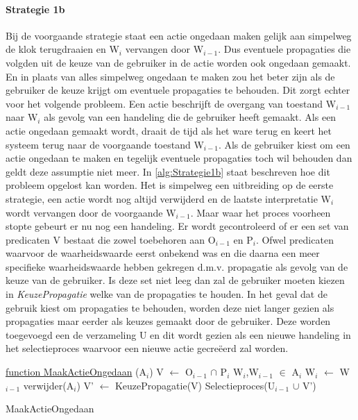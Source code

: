 \paragraph{Strategie 1b}
Bij de voorgaande strategie staat een actie ongedaan maken gelijk aan simpelweg de klok terugdraaien en W$_{i}$ vervangen door W$_{i-1}$. Dus eventuele propagaties die volgden uit de keuze van de gebruiker in de actie worden ook ongedaan gemaakt. En in plaats van alles simpelweg ongedaan te maken zou het beter zijn als de gebruiker de keuze krijgt om eventuele propagaties te behouden. Dit zorgt echter voor het volgende probleem. Een actie beschrijft de overgang van toestand W$_{i-1}$ naar W$_{i}$ als gevolg van een handeling die de gebruiker heeft gemaakt. Als een actie ongedaan gemaakt wordt, draait de tijd als het ware terug en keert het systeem terug naar de voorgaande toestand W$_{i-1}$. Als de gebruiker kiest om een actie ongedaan te maken en tegelijk eventuele propagaties toch wil behouden dan geldt deze assumptie niet meer. In \ref{alg:Strategie1b} staat beschreven hoe dit probleem opgelost kan worden. Het is simpelweg een uitbreiding op de eerste strategie, een actie wordt nog altijd verwijderd en de laatste interpretatie W$_{i}$ wordt vervangen door de voorgaande W$_{i-1}$. Maar waar het proces voorheen stopte gebeurt er nu nog een handeling. Er wordt gecontroleerd of er een set van predicaten V bestaat die zowel toebehoren aan O$_{i-1}$ en P$_{i}$. Ofwel predicaten waarvoor de waarheidswaarde eerst onbekend was en die daarna een meer specifieke waarheidswaarde hebben gekregen d.m.v. propagatie als gevolg van de keuze van de gebruiker. Is deze set niet leeg dan zal de gebruiker moeten kiezen in \textit{KeuzePropagatie} welke van de propagaties te houden. In het geval dat de gebruik kiest om propagaties te behouden, worden deze niet langer gezien als propagaties maar eerder als keuzes gemaakt door de gebruiker. Deze worden toegevoegd een de verzameling U en dit wordt gezien als een nieuwe handeling in het selectieproces waarvoor een nieuwe actie gecre\"{e}erd zal worden.

\begin{algorithm}
	\underline{function MaakActieOngedaan} (A$_{i}$)\;
	V $\leftarrow$ O$_{i-1}$ $\cap$ P$_{i}$\;
	{W$_{i}$,W$_{i-1}$} $\in$ A$_{i}$\;
	W$_{i}$ $\leftarrow$ W$_{i-1}$\;	
	verwijder(A$_{i}$)\;
		{
		V' $\leftarrow$ KeuzePropagatie(V)\;
			{
			Selectieproces(U$_{i-1}$ $\cup$ V')\;
			}
		}
	\caption{MaakActieOngedaan\label{alg:Strategie1b}}
\end{algorithm}

